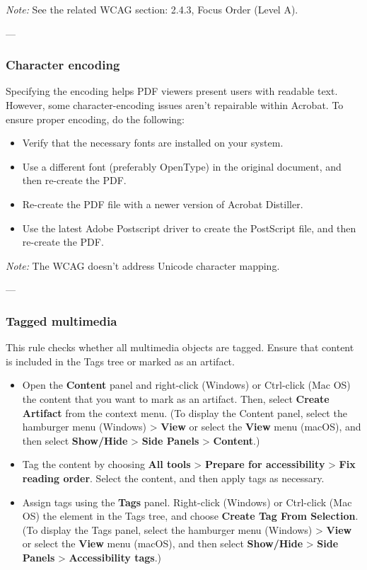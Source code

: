 \vspace{0.5em}
\noindent\textit{Note:} See the related WCAG section: 2.4.3, Focus Order (Level A)\footnotemark[1].

---

\subsubsection*{Character encoding}
Specifying the encoding helps PDF viewers present users with readable text. However, some character-encoding issues aren't repairable within Acrobat\footnotemark[1].
To ensure proper encoding, do the following:
\begin{itemize}
    \item Verify that the necessary fonts are installed on your system.
    \item Use a different font (preferably OpenType) in the original document, and then re-create the PDF.
    \item Re-create the PDF file with a newer version of Acrobat Distiller.
    \item Use the latest Adobe Postscript driver to create the PostScript file, and then re-create the PDF.
\end{itemize}

\vspace{0.5em}
\noindent\textit{Note:} The WCAG doesn't address Unicode character mapping\footnotemark[1].

---

\subsubsection*{Tagged multimedia}
This rule checks whether all multimedia objects are tagged. Ensure that content is included in the Tags tree or marked as an artifact\footnotemark[1].
\begin{itemize}
    \item Open the \textbf{Content} panel and right-click (Windows) or Ctrl-click (Mac OS) the content that you want to mark as an artifact. Then, select \textbf{Create Artifact} from the context menu. (To display the Content panel, select the hamburger menu (Windows) > \textbf{View} or select the \textbf{View} menu (macOS), and then select \textbf{Show/Hide} > \textbf{Side Panels} > \textbf{Content}.)
    \item Tag the content by choosing \textbf{All tools} > \textbf{Prepare for accessibility} > \textbf{Fix reading order}. Select the content, and then apply tags as necessary.
    \item Assign tags using the \textbf{Tags} panel. Right-click (Windows) or Ctrl-click (Mac OS) the element in the Tags tree, and choose \textbf{Create Tag From Selection}. (To display the Tags panel, select the hamburger menu (Windows) > \textbf{View} or select the \textbf{View} menu (macOS), and then select \textbf{Show/Hide} > \textbf{Side Panels} > \textbf{Accessibility tags}.)
\end{itemize}

